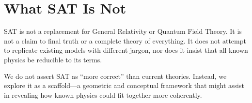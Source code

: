 \documentclass[12pt]{article}
\begin{document}
\section*{What SAT Is Not}

SAT is not a replacement for General Relativity or Quantum Field Theory. It is not a claim to final truth or a complete theory of everything. It does not attempt to replicate existing models with different jargon, nor does it insist that all known physics be reducible to its terms.

We do not assert SAT as “more correct” than current theories. Instead, we explore it as a scaffold---a geometric and conceptual framework that might assist in revealing how known physics could fit together more coherently.
\end{document}
